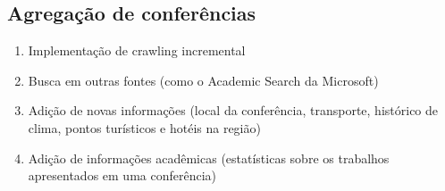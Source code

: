 \subsection{Agregação de conferências}
\begin{enumerate}
\item Implementação de crawling incremental
\item Busca em outras fontes (como o Academic Search da Microsoft)
\item Adição de novas informações (local da conferência, transporte, histórico de clima, pontos turísticos e hotéis na região)
\item Adição de informações acadêmicas (estatísticas sobre os trabalhos apresentados em uma conferência)
\end{enumerate}